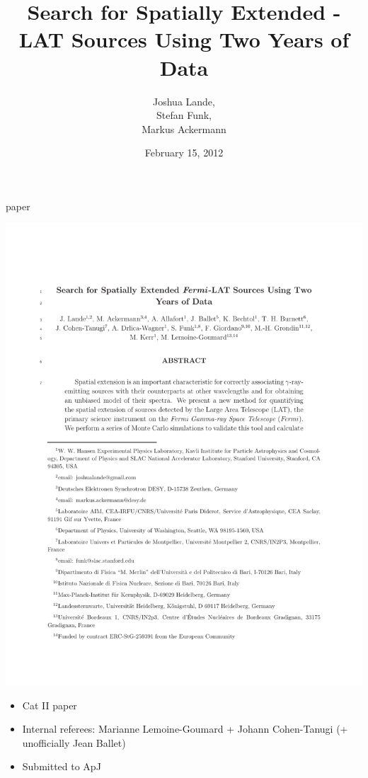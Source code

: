 \documentclass[12pt]{beamer}
\title{Search for Spatially Extended \fermi-LAT Sources Using Two Years of Data}
\author{Joshua Lande,\\
Stefan Funk,\\
Markus Ackermann}
\date{February 15, 2012}
\begin{document}
\fermititle

\begin{frame}{paper}

  \includegraphics[scale=0.65]{plots/title.pdf}

  \begin{itemize}
    \item Cat II paper
    \item Internal referees: Marianne Lemoine-Goumard + Johann Cohen-Tanugi (+ unofficially Jean Ballet)
    \item Submitted to ApJ
  \end{itemize}
\end{frame}
\end{document}
